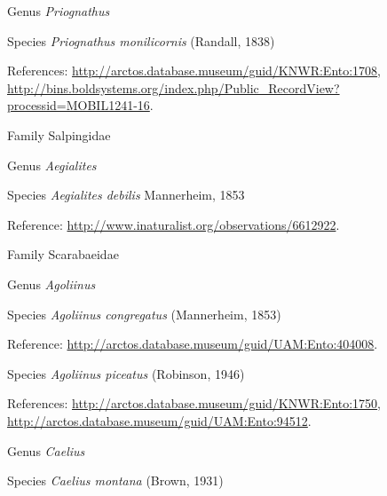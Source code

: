 \documentclass[9pt, article]{memoir}
\begin{document}
\begin{multicols}{2}
\vspace{6pt}\noindent\hspace{30pt}Genus \textit{Priognathus}


\vspace{6pt}\noindent\hspace{36pt}Species \textit{Priognathus monilicornis} (Randall, 1838)


References: 
\url{http://arctos.database.museum/guid/KNWR:Ento:1708}, 
\url{http://bins.boldsystems.org/index.php/Public_RecordView?processid=MOBIL1241-16}.

\vspace{6pt}\noindent\hspace{24pt}Family Salpingidae


\vspace{6pt}\noindent\hspace{30pt}Genus \textit{Aegialites}


\vspace{6pt}\noindent\hspace{36pt}Species \textit{Aegialites debilis} Mannerheim, 1853


Reference: 
\url{http://www.inaturalist.org/observations/6612922}.

\vspace{6pt}\noindent\hspace{24pt}Family Scarabaeidae


\vspace{6pt}\noindent\hspace{30pt}Genus \textit{Agoliinus}


\vspace{6pt}\noindent\hspace{36pt}Species \textit{Agoliinus congregatus} (Mannerheim, 1853)


Reference: 
\url{http://arctos.database.museum/guid/UAM:Ento:404008}.

\vspace{6pt}\noindent\hspace{36pt}Species \textit{Agoliinus piceatus} (Robinson, 1946)


References: 
\url{http://arctos.database.museum/guid/KNWR:Ento:1750}, 
\url{http://arctos.database.museum/guid/UAM:Ento:94512}.

\vspace{6pt}\noindent\hspace{30pt}Genus \textit{Caelius}


\vspace{6pt}\noindent\hspace{36pt}Species \textit{Caelius montana} (Brown, 1931)



\end{multicols}
\end{document}

